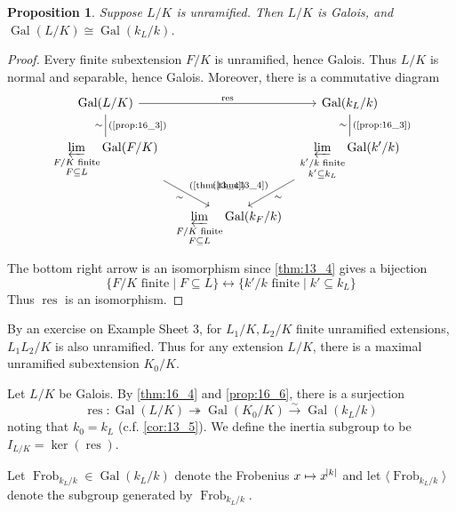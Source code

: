 \documentclass[11pt]{article}
\theoremstyle{definition}
\theoremstyle{plain}
\newtheorem{proposition}[definition]{Proposition}
\theoremstyle{remark}
\DeclareMathOperator{\Gal}{Gal}
\DeclareMathOperator{\res}{res}
\DeclareMathOperator{\Frob}{Frob}
\begin{document}
\begin{proposition}\label{prop:16_6}
    Suppose $L/K$ is unramified. Then $L/K$ is Galois, and $\Gal(L/K) \cong \Gal(k_L / k)$.
\end{proposition}
\begin{proof}
    Every finite subextension $F/K$ is unramified, hence Galois. Thus $L/K$ is normal and separable, hence Galois. Moreover, there is a commutative diagram
    \begin{equation*}
        \begin{tikzcd}[column sep=tiny]
        \Gal(L/K) \arrow[rr, "\res"] \arrow[d, dash, "\sim"', "\text{(\ref{prop:16_3})}"] & & \Gal(k_L/k) \arrow[d, dash, "\sim"', "\text{(\ref{prop:16_3})}"]\\
        \displaystyle\varprojlim_{\substack{F/K \text{ finite}\\ F \subseteq L}} \Gal(F/K) \arrow[rd, "\sim"', "\text{(\ref{thm:13_4})}"]& & \displaystyle\varprojlim_{\substack{k'/k \text{ finite}\\ k' \subseteq k_L}} \Gal(k'/k) \arrow[ld, "\sim", "\text{(\ref{thm:13_4})}"'] \\
        & \displaystyle\varprojlim_{\substack{F/K \text{ finite}\\ F \subseteq L}} \Gal(k_F/k) &
    \end{tikzcd}
    \end{equation*}
    The bottom right arrow is an isomorphism since \autoref{thm:13_4} gives a bijection
    \begin{equation*}
        \{F/K \text{ finite} \mid F \subseteq L\} \longleftrightarrow \{k'/k \text{ finite} \mid k' \subseteq k_L\}
    \end{equation*}
    Thus $\res$ is an isomorphism.
\end{proof}

By an exercise on Example Sheet 3, for $L_1/K, L_2/K$ finite unramified extensions, $L_1 L_2/K$ is also unramified. Thus for any extension $L/K$, there is a maximal unramified subextension $K_0/K$.

Let $L/K$ be Galois. By \autoref{thm:16_4} and \autoref{prop:16_6}, there is a surjection
\begin{equation*}
    \res : \Gal(L/K) \twoheadrightarrow \Gal(K_0/K) \xrightarrow{\sim} \Gal(k_L/k)
\end{equation*}
noting that $k_0 = k_L$ (c.f. \autoref{cor:13_5}). We define the inertia subgroup to be $I_{L/K} = \ker(\res)$.

Let $\Frob_{k_L/k} \in \Gal(k_L/k)$ denote the Frobenius $x \mapsto x^{\abs{k}}$ and let $\langle \Frob_{k_L/k} \rangle$ denote the subgroup generated by $\Frob_{k_L/k}$.
\end{document}
